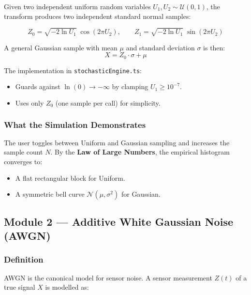 \documentclass[12pt, a4paper]{article}
\begin{document}
Given two independent uniform random variables $U_1, U_2 \sim \mathcal{U}(0,1)$, the
transform produces two independent standard normal samples:

\begin{equation}
  Z_0 = \sqrt{-2\ln U_1}\;\cos(2\pi U_2), \qquad
  Z_1 = \sqrt{-2\ln U_1}\;\sin(2\pi U_2)
  \label{eq:boxmuller}
\end{equation}

A general Gaussian sample with mean $\mu$ and standard deviation $\sigma$ is then:
\begin{equation}
  X = Z_0 \cdot \sigma + \mu
\end{equation}

The implementation in \texttt{stochasticEngine.ts}:
\begin{itemize}
  \item Guards against $\ln(0) \to -\infty$ by clamping $U_1 \geq 10^{-7}$.
  \item Uses only $Z_0$ (one sample per call) for simplicity.
\end{itemize}

\subsubsection{What the Simulation Demonstrates}

The user toggles between Uniform and Gaussian sampling and increases the sample count
$N$. By the \textbf{Law of Large Numbers}, the empirical histogram converges to:
\begin{itemize}
  \item A flat rectangular block for Uniform.
  \item A symmetric bell curve $\mathcal{N}(\mu, \sigma^2)$ for Gaussian.
\end{itemize}

\subsection{Module 2 --- Additive White Gaussian Noise (AWGN)}

\subsubsection{Definition}

AWGN is the canonical model for sensor noise. A sensor measurement $Z(t)$ of a true
signal $X$ is modelled as:
\end{document}
